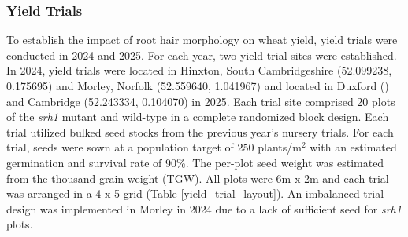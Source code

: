 \documentclass{article}
\begin{document}
\subsubsection{Yield Trials}
To establish the impact of root hair morphology on wheat yield, yield trials were conducted in 2024 and 2025. For each year, two yield trial sites were established. In 2024, yield trials were located in Hinxton, South Cambridgeshire (52.099238, 0.175695) and Morley, Norfolk (52.559640, 1.041967) and located in Duxford () and Cambridge (52.243334, 0.104070) in 2025. Each trial site comprised 20 plots of the \textit{srh1} mutant and wild-type in a complete randomized block design. Each trial utilized bulked seed stocks from the previous year's nursery trials. For each trial, seeds were sown at a population target of 250 plants/m$^{2}$ with an estimated germination and survival rate of 90\%. The per-plot seed weight was estimated from the thousand grain weight (TGW). All plots were 6m x 2m and each trial was arranged in a 4 x 5 grid (Table \ref{yield_trial_layout}). An imbalanced trial design was implemented in Morley in 2024 due to a lack of sufficient seed for \textit{srh1} plots.
\end{document}
